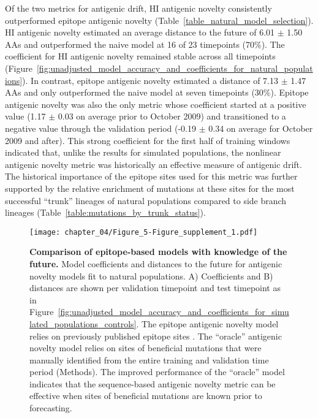 Of the two metrics for antigenic drift, HI antigenic novelty consistently outperformed epitope antigenic novelty (Table~\ref{table_natural_model_selection}).
HI antigenic novelty estimated an average distance to the future of 6.01 $\pm$ 1.50 AAs and outperformed the naive model at 16 of 23 timepoints (70\%).
The coefficient for HI antigenic novelty remained stable across all timepoints (Figure~\ref{fig:unadjusted_model_accuracy_and_coefficients_for_natural_populations}).
In contrast, epitope antigenic novelty estimated a distance of 7.13 $\pm$ 1.47 AAs and only outperformed the naive model at seven timepoints (30\%).
Epitope antigenic novelty was also the only metric whose coefficient started at a positive value (1.17 $\pm$ 0.03 on average prior to October 2009) and transitioned to a negative value through the validation period (-0.19 $\pm$ 0.34 on average for October 2009 and after).
This strong coefficient for the first half of training windows indicated that, unlike the results for simulated populations, the nonlinear antigenic novelty metric was historically an effective measure of antigenic drift.
The historical importance of the epitope sites used for this metric was further supported by the relative enrichment of mutations at these sites for the most successful ``trunk'' lineages of natural populations compared to side branch lineages (Table~\ref{table:mutations_by_trunk_status}).

\begin{figure}
  \texttt{[image: chapter\_04/Figure\_5-Figure\_supplement\_1.pdf]}
  \caption[{Comparison of epitope-based models with knowledge of the future.}]{
    {\bf Comparison of epitope-based models with knowledge of the future.}
    Model coefficients and distances to the future for antigenic novelty models fit to natural populations.
    A) Coefficients and B) distances are shown per validation timepoint and test timepoint as in Figure~\ref{fig:unadjusted_model_accuracy_and_coefficients_for_simulated_populations_controls}.
    The epitope antigenic novelty model relies on previously published epitope sites \citep{Luksza:2014hj}.
    The ``oracle'' antigenic novelty model relies on sites of beneficial mutations that were manually identified from the entire training and validation time period (Methods).
    The improved performance of the ``oracle'' model indicates that the sequence-based antigenic novelty metric can be effective when sites of beneficial mutations are known prior to forecasting.
  }
  \label{fig:unadjusted_composite_model_accuracy_and_coefficients_for_natural_populations_epitope_vs_oracle}
\end{figure}

